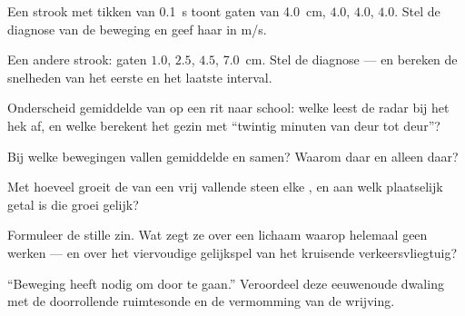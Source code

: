 \begin{exercise}[$\star$]\label{exo:g9:uniform-varied-motion:2}
Een strook met tikken van \qty{0.1}{s} toont gaten van \qty{4.0}{cm},
$4.0$, $4.0$, $4.0$. Stel de diagnose van de beweging en geef haar
 in \unit{m/s}.
\end{exercise}

\begin{exercise}[$\star$]\label{exo:g9:uniform-varied-motion:3}
Een andere strook: gaten $1.0$, $2.5$, $4.5$, \qty{7.0}{cm}. Stel de
diagnose --- en bereken de snelheden van het eerste en het
laatste interval.
\end{exercise}

\begin{exercise}[$\star$]\label{exo:g9:uniform-varied-motion:4}
Onderscheid gemiddelde van  op een rit naar
school: welke leest de radar bij het hek af, en welke berekent het
gezin met ``twintig minuten van deur tot deur''?
\end{exercise}

\begin{exercise}[$\star$]\label{exo:g9:uniform-varied-motion:5}
Bij welke bewegingen vallen gemiddelde en
 samen? Waarom daar en alleen daar?
\end{exercise}

\begin{exercise}[$\star$]\label{exo:g9:uniform-varied-motion:6}
Met hoeveel groeit de  van een vrij vallende steen elke
, en aan welk plaatselijk getal is die groei gelijk?
\end{exercise}

\begin{exercise}[$\star$]\label{exo:g9:uniform-varied-motion:7}
Formuleer de stille zin. Wat zegt ze over een lichaam waarop helemaal
geen  werken --- en over het viervoudige gelijkspel van
het kruisende verkeersvliegtuig?
\end{exercise}

\begin{exercise}[$\star$]\label{exo:g9:uniform-varied-motion:8}
``Beweging heeft  nodig om door te gaan.'' Veroordeel deze
eeuwenoude dwaling met de doorrollende ruimtesonde en de vermomming van
de wrijving.
\end{exercise}

